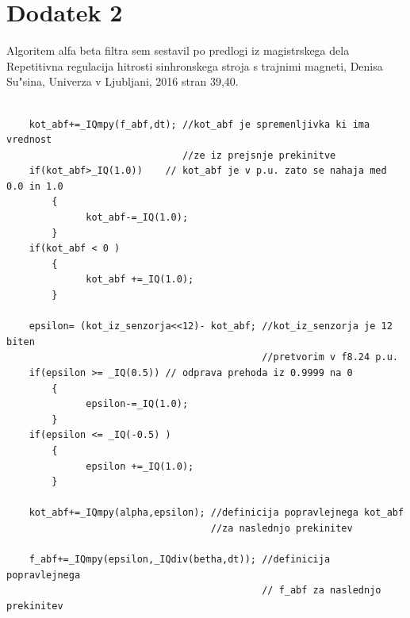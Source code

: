 \documentclass[a4paper]{article}
\begin{document}
\section{Dodatek 2}
\label{Dodatek2}
Algoritem alfa beta filtra sem sestavil po predlogi iz magistrskega dela Repetitivna regulacija hitrosti sinhronskega stroja s trajnimi magneti, Denisa Su"sina, Univerza v Ljubljani, 2016 stran 39,40.
\begin{verbatim}

	kot_abf+=_IQmpy(f_abf,dt); //kot_abf je spremenljivka ki ima vrednost 
	                           //ze iz prejsnje prekinitve
	if(kot_abf>_IQ(1.0))	// kot_abf je v p.u. zato se nahaja med 0.0 in 1.0
		{
			  kot_abf-=_IQ(1.0);
		}
	if(kot_abf < 0 )
		{
			  kot_abf +=_IQ(1.0);
		}
		
	epsilon= (kot_iz_senzorja<<12)- kot_abf; //kot_iz_senzorja je 12 biten 
	                                         //pretvorim v f8.24 p.u.
	if(epsilon >= _IQ(0.5)) // odprava prehoda iz 0.9999 na 0
		{
			  epsilon-=_IQ(1.0);
		}
	if(epsilon <= _IQ(-0.5) )
		{
			  epsilon +=_IQ(1.0);
		}
		
	kot_abf+=_IQmpy(alpha,epsilon); //definicija popravlejnega kot_abf 
	                                //za naslednjo prekinitev

	f_abf+=_IQmpy(epsilon,_IQdiv(betha,dt)); //definicija popravlejnega 
	                                         // f_abf za naslednjo prekinitev
\end{verbatim}
\end{document}
